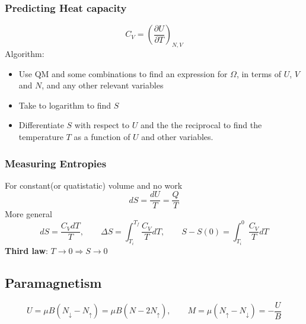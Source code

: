 \documentclass[a4paper,norsk, 10pt]{article}
\begin{document}
\subsubsection{Predicting Heat capacity}
\begin{equation}
C_V = \left(\frac{\partial U}{\partial T}\right)_{N,V}
\end{equation}
Algorithm:
\begin{itemize}
\item Use QM and some combinations to find an expression for $\Omega$, in terms of $U$, $V$ and $N$, and any other relevant variables
\item Take to logarithm to find $S$
\item Differentiate $S$ with respect to $U$ and the the reciprocal to find the temperature $T$ as a function of $U$ and other variables.
\end{itemize}

\subsubsection{Measuring Entropies}
For constant(or quatistatic) volume and no work
\begin{equation}
dS = \frac{dU}{T} = \frac{Q}{T}
\end{equation}
More general
\begin{equation}
dS = \frac{C_V dT}{T},\qquad \Delta S = \int_{T_i}^{T_f}\frac{C_V}{T}dT,\qquad S - S(0) = \int_{T_i}^{0}\frac{C_V}{T}dT
\end{equation}
\textbf{Third law}: $T\rightarrow 0 \Rightarrow S\rightarrow0$
\subsection{Paramagnetism}
\begin{equation}
U = \mu B(N_\downarrow - N_\uparrow) = \mu B (N- 2N_\uparrow),\qquad M = \mu(N_\uparrow - N_\downarrow) = -\frac{U}{B}
\end{equation}
\end{document}
